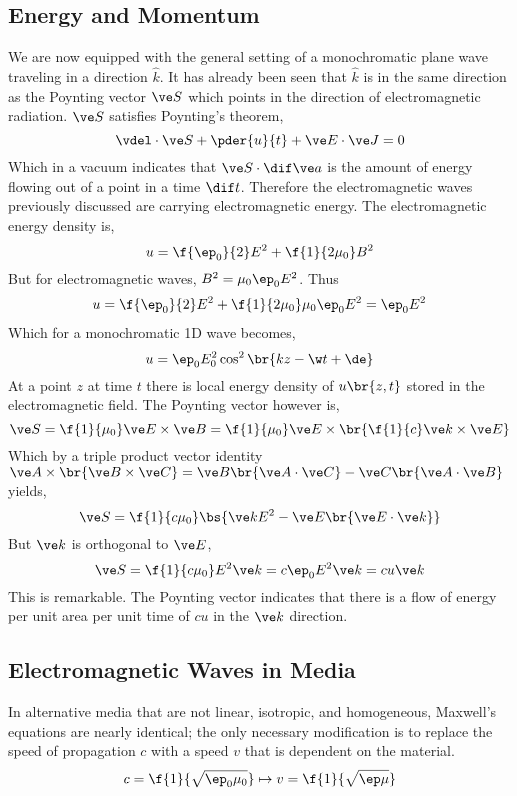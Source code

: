 \documentclass{article}
\begin{document}
\subsection{Energy and Momentum}
We are now equipped with the general setting of a monochromatic plane wave traveling in a direction $\hat k$. It has already been seen that $\hat k$ is in the same direction as the Poynting vector $\ve S$ which points in the direction of electromagnetic radiation. $\ve S$ satisfies Poynting's theorem,
\[ \vdel \cdot \ve S + \pder{u}{t} + \ve E \cdot \ve J = 0 \]
Which in a vacuum indicates that $\ve S \cdot \dif \ve a$ is the amount of energy flowing out of a point in a time $\dif t$. Therefore the electromagnetic waves previously discussed are carrying electromagnetic energy. The electromagnetic energy density is,
\[ u = \f{\ep_0}{2}E^2 + \f{1}{2 \mu_0} B^2 \]
But for electromagnetic waves, $B^2 = \mu_0 \ep_0 E^2$. Thus
\begin{align*}
    u = \f{\ep_0}{2} E^2 + \f{1}{2\mu_0} \mu_0 \ep_0 E^2 = \ep_0 E^2
\end{align*}
Which for a monochromatic 1D wave becomes,
\[  u = \ep_0 E_0^2 \cos^2\br{kz - \w t + \de} \]
At a point $z$ at time $t$ there is local energy density of $u\br{z,t}$ stored in the electromagnetic field. The Poynting vector however is,
\[ \ve S = \f{1}{\mu_0} \ve E \times \ve B = \f{1}{\mu_0} \ve E \times \br{\f{1}{c} \ve k \times \ve E} \]
Which by a triple product vector identity $\ve A \times \br{\ve B \times \ve C} = \ve B \br{\ve A \cdot \ve C} - \ve C \br{\ve A \cdot \ve B}$ yields,
\[ \ve S = \f{1}{c \mu_0} \bs{\ve k E^2 - \ve E \br{\ve E \cdot \ve k}} \]
But $\ve k$ is orthogonal to $\ve E$,
\[ \ve S = \f{1}{c\mu_0} E^2 \ve k = c\ep_0 E^2 \ve k = c u \ve k \]
This is remarkable. The Poynting vector indicates that there is a flow of energy per unit area per unit time of $c u$ in the $\ve k$ direction.

\subsection{Electromagnetic Waves in Media}


In alternative media that are not linear, isotropic, and homogeneous, Maxwell's equations are nearly identical; the only necessary modification is to replace the speed of propagation $c$ with a speed $v$ that is dependent on the material.
\[ c = \f{1}{\sqrt{\ep_0 \mu_0}} \mapsto v = \f{1}{\sqrt{\ep \mu}} \]
\end{document}
